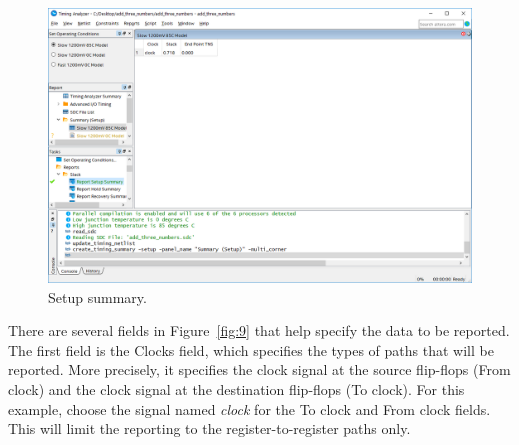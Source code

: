 \documentclass[11pt, twoside, pdftex]{article}
\begin{document}
\begin{figure}[H]
\begin{center}
\includegraphics[scale=0.5]{figures/figure7.png}
\end{center}
\caption{Setup summary.}
\label{fig:7}
\end{figure}

There are several fields in Figure~\ref{fig:9} that help specify the data to be reported. The 
first field is the {\sf Clocks} field, which specifies the types of paths that will be reported. 
More precisely, it specifies the clock signal at the source flip-flops ({\sf From clock}) 
and the clock signal at the destination flip-flops ({\sf To clock}).  For this example, choose 
the signal named {\it clock} for the 
{\sf To clock} and {\sf From clock} fields. This will limit the reporting to the 
register-to-register paths only.
\end{document}
